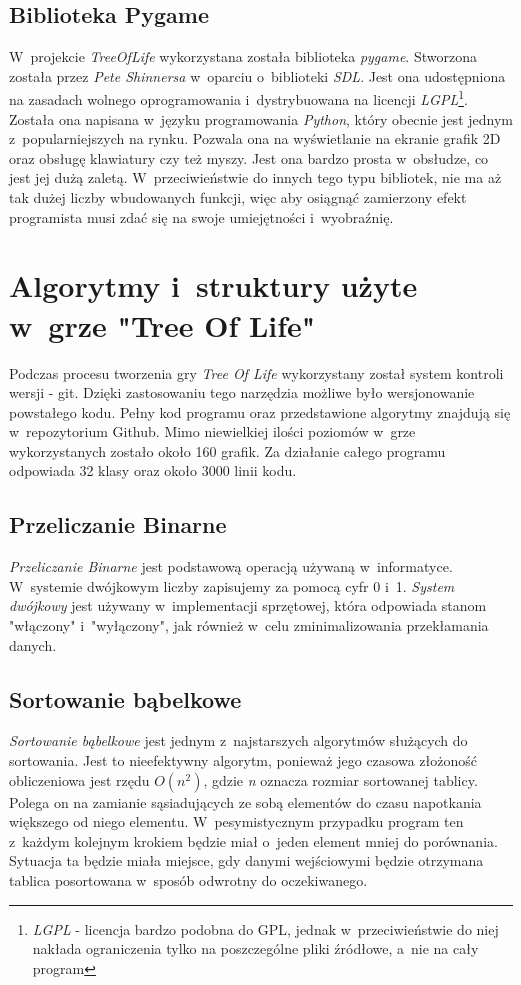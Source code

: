\documentclass[12pt,a4paper,oneside]{book}
\theoremstyle{definition}
\numberwithin{equation}{chapter}
\begin{document}
\subsection{Biblioteka Pygame}
\par W~projekcie \textit{TreeOfLife} wykorzystana została biblioteka \textit{pygame}. Stworzona została przez \textit{Pete Shinnersa} w~oparciu o~biblioteki \textit{SDL}. Jest ona udostępniona na zasadach wolnego oprogramowania i~dystrybuowana na licencji \textit{LGPL}\footnote{\textit{LGPL} - licencja bardzo podobna do GPL, jednak w~przeciwieństwie do niej nakłada ograniczenia tylko na poszczególne pliki źródłowe, a~nie na cały program}. Została ona napisana w~języku programowania \textit{Python}, który obecnie jest jednym z~popularniejszych na rynku. Pozwala ona na wyświetlanie na ekranie grafik 2D oraz obsługę klawiatury czy też myszy. Jest ona bardzo prosta w~obsłudze, co jest jej dużą zaletą. W~przeciwieństwie do innych tego typu bibliotek, nie ma aż tak dużej liczby wbudowanych funkcji, więc aby osiągnąć zamierzony efekt programista musi zdać się na swoje umiejętności i~wyobraźnię.

\section{Algorytmy i~struktury użyte w~grze "Tree Of Life"}
\par Podczas procesu tworzenia gry \textit{Tree Of Life} wykorzystany został system kontroli wersji - git. Dzięki zastosowaniu tego narzędzia możliwe było wersjonowanie powstałego kodu. Pełny kod programu oraz przedstawione algorytmy znajdują się w~repozytorium Github\cite{Github}. Mimo niewielkiej ilości poziomów w~grze wykorzystanych zostało około 160 grafik. Za działanie całego programu odpowiada 32 klasy oraz około 3000 linii kodu.

\subsection{Przeliczanie Binarne}
\par \textit{Przeliczanie Binarne} jest podstawową operacją używaną w~informatyce. W~systemie dwójkowym liczby zapisujemy za pomocą cyfr 0 i~1. \textit{System dwójkowy} jest używany w~implementacji sprzętowej, która odpowiada stanom "włączony" i~"wyłączony", jak również w~celu zminimalizowania przekłamania danych. 

\subsection{Sortowanie bąbelkowe}
\par \textit{Sortowanie bąbelkowe} jest jednym z~najstarszych algorytmów służących do sortowania. Jest to nieefektywny algorytm, ponieważ jego czasowa złożoność obliczeniowa jest rzędu $O(n^2)$, gdzie \textit{n} oznacza rozmiar sortowanej tablicy. Polega on na zamianie sąsiadujących ze sobą elementów do czasu napotkania większego od niego elementu. W~pesymistycznym przypadku program ten z~każdym kolejnym krokiem będzie miał o~jeden element mniej do porównania. Sytuacja ta będzie miała miejsce, gdy danymi wejściowymi będzie otrzymana tablica posortowana w~sposób odwrotny do oczekiwanego.
\end{document}
